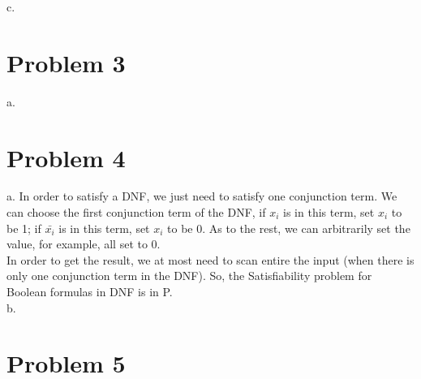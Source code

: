 \documentclass[12pt]{article}
\begin{document}
c. 


\section*{Problem 3}

a. 


\section*{Problem 4}

a. In order to satisfy a DNF, we just need to satisfy one conjunction term. We can choose the first conjunction term of the DNF, if $x_i$ is in this term, set $x_i$ to be 1; if $\bar {x_i}$ is in this term, set $x_i$ to be 0. As to the rest, we can arbitrarily set the value, for example, all set to 0. \\

In order to get the result, we at most need to scan entire the input (when there is only one conjunction term in the DNF). So, the Satisfiability problem for Boolean formulas in DNF is in P. \\

b. \\

\section*{Problem 5}
\end{document}
